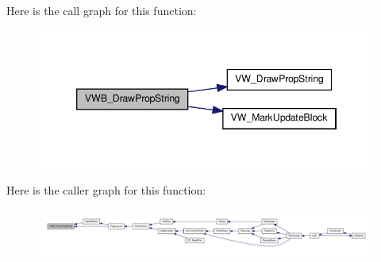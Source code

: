 Here is the call graph for this function:
\nopagebreak
\begin{figure}[H]
\begin{center}
\leavevmode
\includegraphics[width=346pt]{ID__VH_8H_a8efd746c0d9c5c4e7015b569e4f6bb24_cgraph}
\end{center}
\end{figure}




Here is the caller graph for this function:
\nopagebreak
\begin{figure}[H]
\begin{center}
\leavevmode
\includegraphics[width=400pt]{ID__VH_8H_a8efd746c0d9c5c4e7015b569e4f6bb24_icgraph}
\end{center}
\end{figure}


